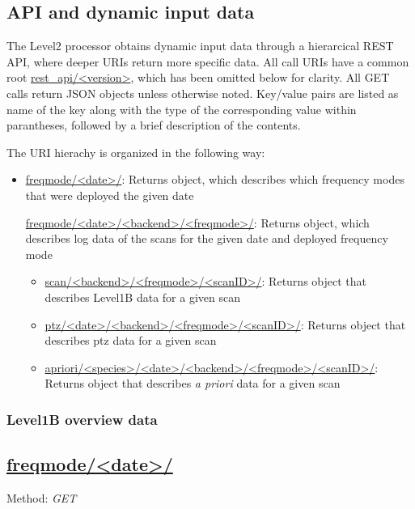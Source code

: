 \clearpage
\newpage
\subsection{API and dynamic input data}
\label{sec:api}

The Level2 processor obtains dynamic input data through
a hierarcical REST API, where deeper URIs return more
specific data.  All call URIs have a common root \url{rest_api/<version>}, which
has been omitted below for clarity.  All GET calls return JSON objects unless
otherwise noted. Key/value pairs are listed as name of the key
along with the type of the corresponding value within parantheses, followed
by a brief description of the contents.  

The URI hierachy is organized in the following way:
\begin{itemize}
    \item \url{freqmode/<date>/}: Returns object, which describes which frequency modes that were deployed the
    given date
    \begin{itemize}
        \url{freqmode/<date>/<backend>/<freqmode>/}: Returns object, which describes log data of the scans
        for the given date and deployed frequency mode
        \begin{itemize}
           \item \url{scan/<backend>/<freqmode>/<scanID>/}: Returns object that describes Level1B data for a given scan       
           \item \url{ptz/<date>/<backend>/<freqmode>/<scanID>/}: Returns object that describes ptz data for a given scan
           \item \url{apriori/<species>/<date>/<backend>/<freqmode>/<scanID>/}: Returns object that describes \textit{a priori} data for a given scan
        \end{itemize}  
    \end{itemize}
\end{itemize}
  

\subsubsection{Level1B overview data}
\subsection*{\url{freqmode/<date>/}}
Method: \emph{GET}

